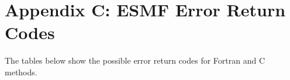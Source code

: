 %

\section{Appendix C:  ESMF Error Return Codes}
\label{appendix_esmf_error_codes}

The tables below show the possible error return codes for Fortran and
C methods. 



